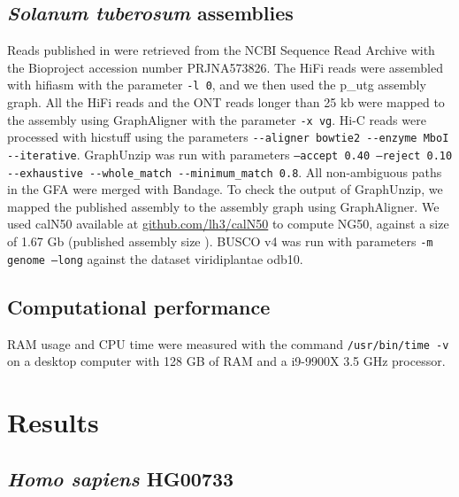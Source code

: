 \subsection{\textit{Solanum tuberosum} assemblies}

Reads published in \cite{potato} were retrieved from the NCBI Sequence Read Archive with the Bioproject accession number PRJNA573826. The HiFi reads were assembled with hifiasm with the parameter \texttt{-l 0}, and we then used the p\_utg assembly graph. All the HiFi reads and the ONT reads longer than 25 kb were mapped to the assembly using GraphAligner with the parameter \texttt{-x vg}. Hi-C reads were processed with hicstuff using the parameters \texttt{-{}-aligner bowtie2 -{}-enzyme MboI -{}-iterative}. GraphUnzip was run with parameters \texttt{--accept 0.40 --reject 0.10 -{}-exhaustive -{}-whole\_match -{}-minimum\_match 0.8}. All non-ambiguous paths in the GFA were merged with Bandage. To check the output of GraphUnzip, we mapped the published assembly to the assembly graph using GraphAligner. We used calN50 available at \href{https://github.com/lh3/calN50}{github.com/lh3/calN50} to compute NG50, against a size of 1.67 Gb (published assembly size \cite{potato}). BUSCO v4 \cite{busco_evaluation} was run with parameters \texttt{-m genome --long} against the dataset viridiplantae odb10. 

\subsection{Computational performance}

RAM usage and CPU time were measured with the command \texttt{/usr/bin/time -v} on a desktop computer with 128 GB of RAM and a i9-9900X 3.5 GHz processor.

\section{Results}

\subsection{\textit{Homo sapiens} HG00733}

